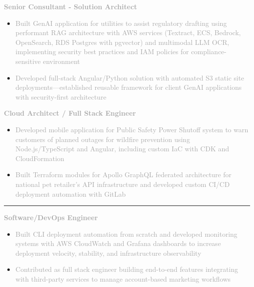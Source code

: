 \documentclass[10pt,letterpaper]{article}
\newcommand{\companyHeader}[2]{%
    \vspace{3pt}
    \noindent\textcolor{#2}{\rule{3pt}{10pt}}\hspace{6pt}{\headingfont\normalsize\textbf{\textcolor{darkgray}{#1}}}
    \vspace{1pt}
}
\newcommand{\positionHeader}[2]{%
    \noindent\textbf{\textcolor{darkgray}{#2}}\hspace{4pt}{\footnotesize\textcolor{mediumgray}{//}}\hspace{4pt}{\footnotesize\itshape\textcolor{mediumgray}{#1}}
    \vspace{1pt}
}
\begin{document}
\begin{minipage}[t][10.5in][t]{5.6in}
\begin{minipage}{5.0in}
\vspace{1pt}

\positionHeader{2022 – 2023}{Senior Consultant - Solution Architect}
\begin{itemize}
    \setlength\itemsep{0.25pt}
    \item\small\textcolor{darkgray}{Built GenAI application for utilities to assist regulatory drafting using performant RAG architecture with AWS services (Textract, ECS, Bedrock, OpenSearch, RDS Postgres with pgvector) and multimodal LLM OCR, implementing security best practices and IAM policies for compliance-sensitive environment}
    \item\small\textcolor{darkgray}{Developed full-stack Angular/Python solution with automated S3 static site deployments—established reusable framework for client GenAI applications with security-first architecture}
\end{itemize}

\vspace{1pt}

\positionHeader{2022}{Cloud Architect / Full Stack Engineer}
\begin{itemize}
    \setlength\itemsep{0.25pt}
    \item\small\textcolor{darkgray}{Developed mobile application for Public Safety Power Shutoff system to warn customers of planned outages for wildfire prevention using Node.js/TypeScript and Angular, including custom IaC with CDK and CloudFormation}
    \item\small\textcolor{darkgray}{Built Terraform modules for Apollo GraphQL federated architecture for national pet retailer's API infrastructure and developed custom CI/CD deployment automation with GitLab}
\end{itemize}

\companyHeader{Triblio}{company2}

\positionHeader{2021 – 2022}{Software/DevOps Engineer}
\begin{itemize}
    \setlength\itemsep{0.25pt}
    \item\small\textcolor{darkgray}{Built CLI deployment automation from scratch and developed monitoring systems with AWS CloudWatch and Grafana dashboards to increase deployment velocity, stability, and infrastructure observability}
    \item\small\textcolor{darkgray}{Contributed as full stack engineer building end-to-end features integrating with third-party services to manage account-based marketing workflows}
\end{itemize}


\end{minipage}
\end{minipage}
\end{document}
